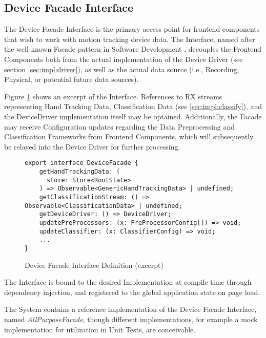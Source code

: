 \subsection{Device Facade Interface}
The Device Facade Interface is the primary access point for frontend components that wish to work with motion tracking device data. The Interface, named after the well-known Facade pattern in Software Development \cite{Gamma:1995:DPE:186897}, decouples the Frontend Components both from the actual implementation of the Device Driver (see section \ref{sec:impl:driver}), as well as the actual data source (i.e., Recording, Physical, or potential future data sources).


Figure \ref{fig:device-facade-interface} shows an excerpt of the Interface. References to \gls{RX} streams representing Hand Tracking Data, Classification Data (see \ref{sec:impl:classify}), and the DeviceDriver implementation itself may be optained. Additionally, the Facade may receive Configuration updates regarding the Data Preprocessing and Classification Frameworks from Frontend Components, which will subsequently be relayed into the Device Driver for further processing.
\begin{figure}
\begin{verbatim}
export interface DeviceFacade {
    getHandTrackingData: (
      store: Store<RootState>
    ) => Observable<GenericHandTrackingData> | undefined;
    getClassificationStream: () => Observable<ClassificationData> | undefined;
    getDeviceDriver: () => DeviceDriver;
    updatePreProcessors: (x: PreProcessorConfig[]) => void;
    updateClassifier: (x: ClassifierConfig) => void;
    ...
}
\end{verbatim}
\caption{Device Facade Interface Definition (excerpt)}
\label{fig:device-facade-interface}
\end{figure}
The Interface is bound to the desired Implementation at compile time through dependency injection, and registered to the global application state on page load.

The System contains a reference implementation of the Device Facade Interface, named \emph{AllPurposeFacade}, though different implementations, for example a mock implementation for utilization in Unit Tests, are conceivable.
